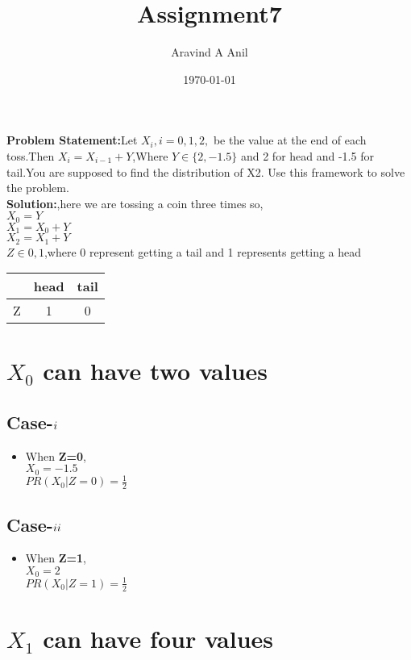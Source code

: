 \documentclass[11pt,a4paper,twocolumn]{article}
\title{Assignment7}
\author{Aravind A Anil}
\date{\today}
\begin{document}
\maketitle
\textbf{Problem Statement:}Let $X_i,i=0,1,2,$ be the value at the end of each toss.Then $X_i=X_{i-1}+Y$,Where $Y\in\{2,-1.5\}$ and 2 for head and -1.5 for tail.You are supposed to find the distribution of X2.  Use this framework to solve the problem.\\
\textbf{Solution:},here we are tossing a coin three times so,\\
$X_{0}=Y$\\
$X_{1}=X_{0}+Y$\\
$X_{2}=X_{1}+Y$\\
$Z\in{0,1}$,where 0 represent getting a tail and 1 represents getting a head
\begin{table}[ht]
    \centering
    \begin{tabular}{|c|c|c|}
\hline
     &head&tail  \\
     \hline
     Z&1&0\\
     \hline
\end{tabular}
\end{table}
\section{ $X_{0}$ can have two values}
    \subsection{Case-$\romannumeral1$}
\begin{itemize}
    \item When \textbf{Z=0},\\
    $X_{0}=-1.5$\\
$PR(X_{0}|Z=0)=\frac{1}{2}$
\end{itemize}
\subsection{Case-$\romannumeral2$}
\begin{itemize}
    \item When \textbf{Z=1},\\
    $X_{0}=2$\\
    $PR(X_{0}|Z=1)=\frac{1}{2}$
\end{itemize}
    \section{\textbf{$X_{1}$ can have four values}}
\end{document}
